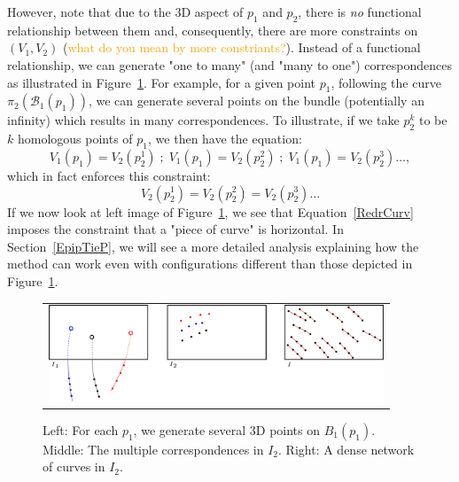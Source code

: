 \documentclass{ipol}
\newcommand{\Bund}[1]{\ensuremath{\mathcal{B}_{#1}}}
\newcommand{\BundO}{\Bund{1}}
\newcommand{\er}[1]{\textcolor{orange}{#1}}
\begin{document}
However, note that due to {the $3$D aspect} of $p_1$ and $p_2$, there is
\emph{no} functional relationship between them and, consequently,
there are more constraints on $(V_1,V_2)$ (\er{what do you mean by more constriants?}). Instead of a functional relationship,
we can generate  "one to many" (and  "many to one") correspondences as illustrated in Figure~\ref{NonFuncCorresp}.
For example, for a given  point $p_1$, following the curve $\pi_2(\BundO(p_1))$, we can generate
several points on the bundle (potentially an infinity) which results in many correspondences.
To illustrate, if we take $p^k_2$ to be $k$ homologous points of $p_1$,
we then have the equation:
%
\begin{equation}
    V_1(p_1) = V_2(p^1_2)   \;;\; V_1(p_1) = V_2(p^2_2)   \;;\; V_1(p_1) = V_2(p^3_2)  \dots , \label{MultiTieP}
\end{equation}
%
which in fact enforces this constraint: 
%
\begin{equation}
V_2(p^1_2) = V_2(p^2_2)  =  V_2(p^3_2) \dots \label{RedrCurv}
\end{equation}
%
If we now look at left image of Figure~\ref{NonFuncCorresp}, we see that Equation~\eqref{RedrCurv}
imposes the constraint that a "piece of curve" is horizontal.
In Section~\ref{EpipTieP}, we will see a more detailed analysis explaining how the 
method can work even with configurations different than those depicted in Figure~\ref{NonFuncCorresp}.


\begin{figure}[h!]
\centering
\begin{tabular}{c}
\includegraphics[width=10cm]{FIGS/NonFuncCorresp.png}
\end{tabular}
\caption{Left: For each $p_1$, we generate several $3$D points on $B_1(p_1)$. Middle:
         The multiple correspondences in $I_2$. Right: A dense network of curves in $I_2$.}
 
\label{NonFuncCorresp}
\end{figure}

\end{document}
